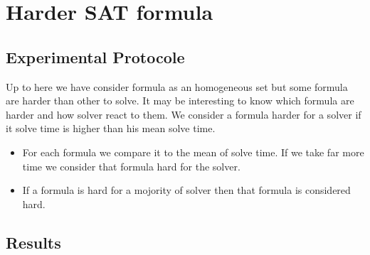\documentclass{article}
\begin{document}

\section{Harder SAT formula}
\subsection{Experimental Protocole}
Up to here we have consider formula as an homogeneous set but some formula are harder than other to solve. It may be interesting to know which formula are harder and how solver react to them. We consider a formula harder for a solver if it solve time is higher than his mean solve time.
\begin{itemize}
\item For each formula we compare it to the mean of solve time. If we take far more time we consider that formula hard for the solver.
\item If a formula is hard for a mojority of solver then that formula is considered hard. 
\end{itemize}
\subsection{Results}

\end{document}
